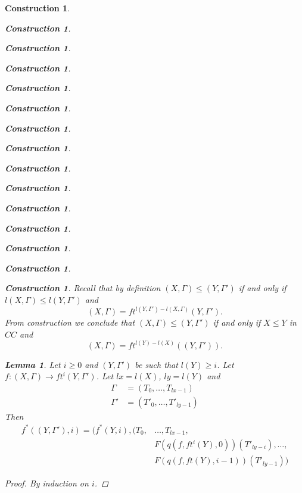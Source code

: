 \documentclass[12pt]{amsart}
\newtheorem{lemma}[proposition]{Lemma}
\numberwithin{proposition}{subsection}
\newtheorem{construction}[proposition]{Construction}
\newcommand{\llabel}[1]{\label{#1}}
\newcommand{\sr}{\rightarrow}
\begin{document}
\begin{construction}
\begin{construction}
\begin{construction}
\begin{construction}
\begin{construction}
\begin{construction}
\begin{construction}
\begin{construction}
\begin{construction}
\begin{construction}
\begin{construction}
\begin{construction}
\begin{construction}
\begin{construction}
\begin{construction}
Recall that by definition $(X,\Gamma)\le (Y,\Gamma')$ if and only if $l(X,\Gamma)\le l(Y,\Gamma')$ and 
%
$$(X,\Gamma)=ft^{l(Y,\Gamma')-l(X,\Gamma)}(Y,\Gamma').$$
%
From construction we conclude that $(X,\Gamma)\le (Y,\Gamma')$ if and only if $X\le Y$ in $CC$ and 
%
$$(X,\Gamma)=ft^{l(Y)-l(X)}((Y,\Gamma')).$$ 
%
\begin{lemma}
\llabel{2016.01.31.l1} 
Let $i\ge 0$ and $(Y,\Gamma')$ be such that $l(Y)\ge i$. 
Let $f:(X,\Gamma)\sr ft^i(Y,\Gamma')$. Let $lx=l(X)$, $ly=l(Y)$ and
%
\begin{equation*}
  \begin{split}
    \Gamma&=(T_0,\dots,T_{lx-1})\\
    \Gamma'&=(T'_0,\dots,T'_{ly-1})
  \end{split}
\end{equation*}
%
Then
%
\begin{equation*}
  \begin{split}
    f^*((Y,\Gamma'),i)=(f^*(Y,i),(T_0,&\dots,T_{lx-1},
    \\&
    F(q(f,ft^i(Y),0))(T'_{ly-i}),\dots,
    \\&
    F(q(f,ft(Y),i-1))(T'_{ly-1}))
  \end{split}
\end{equation*}
%
\end{lemma}
%
\begin{proof}
By induction on $i$.


\end{proof}
\end{construction}
\end{construction}
\end{construction}
\end{construction}
\end{construction}
\end{construction}
\end{construction}
\end{construction}
\end{construction}
\end{construction}
\end{construction}
\end{construction}
\end{construction}
\end{construction}
\end{construction}
\end{document}
